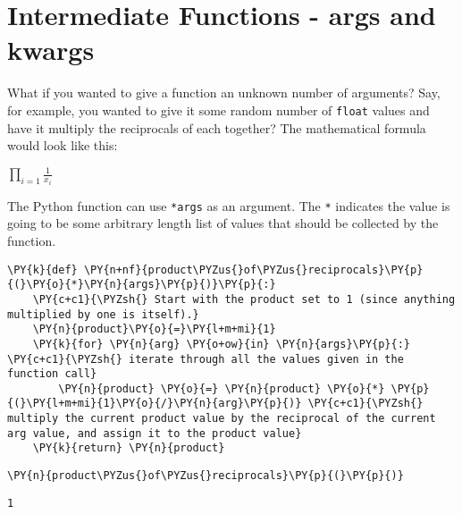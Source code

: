 \section{Intermediate Functions - args and kwargs}
What if you wanted to give a function an unknown number of arguments?
Say, for example, you wanted to give it some random number of
\texttt{float} values and have it multiply the reciprocals of each
together? The mathematical formula would look like this:

\(\prod\limits_{i=1}\frac{1}{x_i}\)

The Python function can use \texttt{*args} as an argument. The
\texttt{*} indicates the value is going to be some arbitrary length list
of values that should be collected by the function.

    \begin{tcolorbox}[breakable, size=fbox, boxrule=1pt, pad at break*=1mm,colback=cellbackground, colframe=cellborder]
\begin{Verbatim}[commandchars=\\\{\}]
\PY{k}{def} \PY{n+nf}{product\PYZus{}of\PYZus{}reciprocals}\PY{p}{(}\PY{o}{*}\PY{n}{args}\PY{p}{)}\PY{p}{:}
    \PY{c+c1}{\PYZsh{} Start with the product set to 1 (since anything multiplied by one is itself).}
    \PY{n}{product}\PY{o}{=}\PY{l+m+mi}{1}
    \PY{k}{for} \PY{n}{arg} \PY{o+ow}{in} \PY{n}{args}\PY{p}{:} \PY{c+c1}{\PYZsh{} iterate through all the values given in the function call}
        \PY{n}{product} \PY{o}{=} \PY{n}{product} \PY{o}{*} \PY{p}{(}\PY{l+m+mi}{1}\PY{o}{/}\PY{n}{arg}\PY{p}{)} \PY{c+c1}{\PYZsh{} multiply the current product value by the reciprocal of the current arg value, and assign it to the product value}
    \PY{k}{return} \PY{n}{product}
\end{Verbatim}
\end{tcolorbox}

    \begin{tcolorbox}[breakable, size=fbox, boxrule=1pt, pad at break*=1mm,colback=cellbackground, colframe=cellborder]
\begin{Verbatim}[commandchars=\\\{\}]
\PY{n}{product\PYZus{}of\PYZus{}reciprocals}\PY{p}{(}\PY{p}{)}
\end{Verbatim}
\end{tcolorbox}

            \begin{tcolorbox}[breakable, size=fbox, boxrule=.5pt, pad at break*=1mm, opacityfill=0]
\begin{Verbatim}[commandchars=\\\{\}]
1
\end{Verbatim}
\end{tcolorbox}
        
